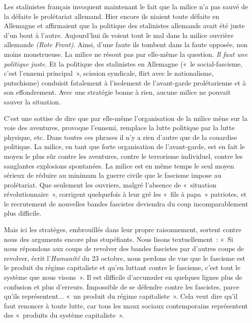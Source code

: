 \documentclass[french,twoside]{book} %
\begin{document}
Les stalinistes français invoquent maintenant le fait que la milice n’a pas sauvé de la défaite le prolétariat allemand. Hier encore ils niaient toute défaite en Allemagne et affirmaient que la politique des stalinistes allemands avait été juste d’un bout à l’autre. Aujourd’hui ils voient tout le mal dans la milice ouvrière allemande \emph{(Rote Front)}. Ainsi, d’une faute ils tombent dans la faute opposée, non moins monstrueuse. La milice ne résout pas par elle-même la question. \emph{Il faut une politique juste.} Et la politique des stalinistes en Allemagne (« le social-fascisme, c’est l’ennemi principal », scission syndicale, flirt avec le nationalisme, putschisme) conduisit fatalement à l’isolement de l’avant-garde prolétarienne et à son effondrement. Avec une stratégie bonne à rien, aucune milice ne pouvait sauver la situation.\par
C’est une sottise de dire que par elle-même l’organisation de la milice mène sur la voie des aventures, provoque l’ennemi, remplace la lutte politique par la lutte physique, etc. Dans toutes ces phrases il n’y a rien d’autre que de la couardise politique. La milice, en tant que forte organisation de l’avant-garde, est en fait le moyen le plus  sûr contre les aventures, contre le terrorisme individuel, contre les sanglantes explosions spontanées. La milice est en même temps le seul moyen sérieux de réduire au minimum la guerre civile que le fascisme impose au prolétariat. Que seulement les ouvriers, malgré l’absence de « situation révolutionnaire », corrigent quelquefois à leur gré les « fils à papa » patriotes, et le recrutement de nouvelles bandes fascistes deviendra du coup incomparablement plus difficile.\par
Mais ici les stratèges, embrouillés dans leur propre raisonnement, sortent contre nous des arguments encore plus stupéfiants. Nous lisons textuellement : « Si nous répondons aux coups de revolver des bandes fascistes par d’autres coups de revolver, écrit l’\emph{Humanité} du 23 octobre, nous perdons de vue que le fascisme est le produit du régime capitaliste et qu’en luttant contre le fascisme, c’est tout le système que nous visons ». Il est difficile d’accumuler en quelques lignes plus de confusion et plus d’erreurs. Impossible de se défendre contre les fascistes, parce qu’ils représentent... « un produit du régime capitaliste ». Cela veut dire qu’il faut renoncer à toute lutte, car tous les maux sociaux contemporains représentent des « produits du système capitaliste ».\par
\end{document}
